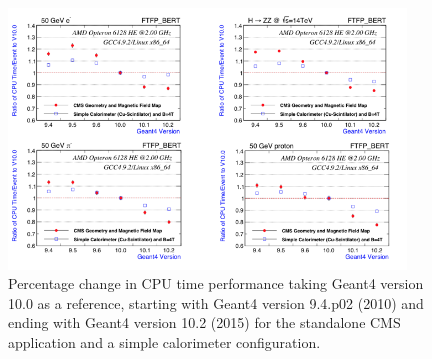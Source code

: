 \documentclass[12pt,a4paper]{article}
\begin{document}
{\begin{figure}[bthp]
\vspace*{0.3cm}
\centering
\includegraphics[width=0.94\textwidth]{image10.png}
\caption{Percentage change in CPU time performance taking Geant4
version 10.0 as a reference, starting with Geant4 version 9.4.p02 (2010)
and ending with Geant4 version 10.2 (2015) for the standalone CMS
application and a simple calorimeter configuration.}
\label{fig:perfchange}
\end{figure}

}
\end{document}
